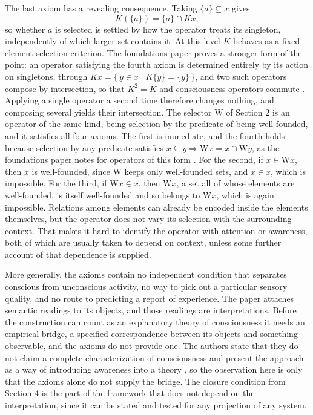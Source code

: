 \documentclass[11pt, a4paper]{article}
\theoremstyle{plain}
\theoremstyle{definition}
\theoremstyle{remark}
\newcommand{\lift}{\mathrm{W}}
\begin{document}
The last axiom has a revealing consequence. Taking $\{a\} \subseteq x$ gives
\[
K(\{a\}) = \{a\} \cap Kx,
\]
so whether $a$ is selected is settled by how the operator treats its singleton, independently of which larger set contains it. At this level $K$ behaves as a fixed element-selection criterion. The foundations paper proves a stronger form of the point: an operator satisfying the fourth axiom is determined entirely by its action on singletons, through $Kx = \{\, y \in x \mid K\{y\} = \{y\} \,\}$, and two such operators compose by intersection, so that $K^2 = K$ and consciousness operators commute \cite{mz2009}. Applying a single operator a second time therefore changes nothing, and composing several yields their intersection. The selector $\lift$ of Section 2 is an operator of the same kind, being selection by the predicate of being well-founded, and it satisfies all four axioms. The first is immediate, and the fourth holds because selection by any predicate satisfies $x \subseteq y \Rightarrow \lift x = x \cap \lift y$, as the foundations paper notes for operators of this form \cite{mz2009}. For the second, if $x \in \lift x$, then $x$ is well-founded, since $\lift$ keeps only well-founded sets, and $x \in x$, which is impossible. For the third, if $\lift x \in x$, then $\lift x$, a set all of whose elements are well-founded, is itself well-founded and so belongs to $\lift x$, which is again impossible. Relations among elements can already be encoded inside the elements themselves, but the operator does not vary its selection with the surrounding context. That makes it hard to identify the operator with attention or awareness, both of which are usually taken to depend on context, unless some further account of that dependence is supplied.

More generally, the axioms contain no independent condition that separates conscious from unconscious activity, no way to pick out a particular sensory quality, and no route to predicting a report of experience. The paper attaches semantic readings to its objects, and those readings are interpretations. Before the construction can count as an explanatory theory of consciousness it needs an empirical bridge, a specified correspondence between its objects and something observable, and the axioms do not provide one. The authors state that they do not claim a complete characterization of consciousness and present the approach as a way of introducing awareness into a theory \cite{mz2009}, so the observation here is only that the axioms alone do not supply the bridge. The closure condition from Section 4 is the part of the framework that does not depend on the interpretation, since it can be stated and tested for any projection of any system.
\end{document}
